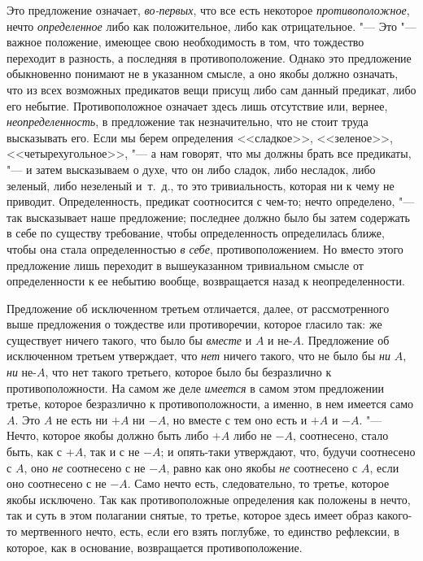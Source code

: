 Это предложение означает, {\em во-первых}, что все есть
некоторое {\em противоположное}, нечто
{\em определенное} либо как положительное, либо как
отрицательное. "--- Это "--- важное положение, имеющее свою необходимость в
том, что тождество переходит в разность, а последняя в противоположение.
Однако это предложение обыкновенно понимают не в указанном смысле, а оно якобы
должно означать, что из всех возможных предикатов вещи присущ либо сам
данный предикат, либо его небытие. Противоположное означает здесь лишь
отсутствие или, вернее, {\em неопределенность}, в
предложение так незначительно, что не стоит труда высказывать его. Если мы
берем определения <<сладкое>>, <<зеленое>>, <<четырехугольное>>, "--- а нам
говорят, что мы должны брать все предикаты, "--- и затем высказываем о духе,
что он либо сладок, либо несладок, либо зеленый, либо незеленый и~т.~д., то
это тривиальность, которая ни к чему не приводит. Определенность, предикат
соотносится с чем-то; нечто определено, "--- так высказывает наше предложение;
последнее должно было бы затем содержать в себе по существу требование,
чтобы определенность определилась ближе, чтобы она стала определенностью
{\em в себе}, противоположением. Но вместо этого
предложение лишь переходит в вышеуказанном тривиальном смысле от
определенности к ее небытию вообще, возвращается назад к неопределенности.

Предложение об исключенном третьем отличается, далее, от рассмотренного выше
предложения о тождестве или противоречии, которое гласило так: же
существует ничего такого, что было бы {\em вместе} и
$A$ и не-$A$. Предложение об исключенном третьем утверждает,
что {\em нет} ничего такого, что не было бы {\em ни} $A$, {\em ни} не-$A$,
что нет такого третьего, которое было бы безразлично к
противоположности. На самом же деле {\em имеется} в
самом этом предложении третье, которое безразлично к противоположности, а
именно, в нем имеется само $A$. Это $A$ не есть ни
$+A$ ни $-A$, но вместе с тем оно есть и $+A$ и
$-A$. "--- Нечто, которое якобы должно быть либо $+A$ либо
не $-A$, соотнесено, стало быть, как с $+A$, так и с
не $-A$; и опять-таки утверждают, что, будучи соотнесено с
$A$, оно {\em не} соотнесено с не $-A$,
равно как оно якобы {\em не} соотнесено с $A$,
если оно соотнесено с не $-A$. Само нечто есть, следовательно, то
третье, которое якобы исключено. Так как противоположные определения как
положены в нечто, так и суть в этом полагании снятые, то третье, которое
здесь имеет образ какого-то мертвенного нечто, есть, если его взять
поглубже, то единство рефлексии, в которое, как в основание, возвращается
противоположение.

